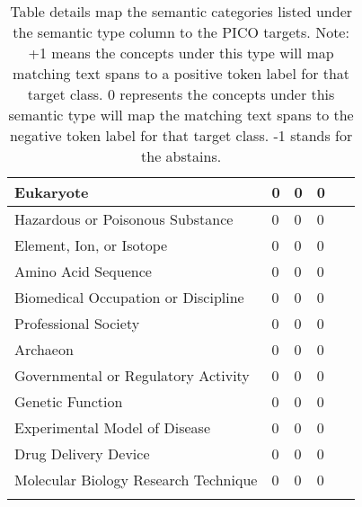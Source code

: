 \documentclass[10.7pt,]{article}
\begin{document}
\begin{longtable}{|l|p{0.3cm}|p{0.3cm}|p{0.3cm}|p{7.9cm}|}
        Eukaryote & 0 & 0 & 0 & ~ \\ \hline
        Hazardous or Poisonous Substance & 0 & 0 & 0 & ~ \\ \hline
        Element, Ion, or Isotope & 0 & 0 & 0 & ~ \\ \hline
        Amino Acid Sequence & 0 & 0 & 0 & ~ \\ \hline
        Biomedical Occupation or Discipline & 0 & 0 & 0 & ~ \\ \hline
        Professional Society & 0 & 0 & 0 & ~ \\ \hline
        Archaeon & 0 & 0 & 0 & ~ \\ \hline
        Governmental or Regulatory Activity & 0 & 0 & 0 & ~ \\ \hline
        Genetic Function & 0 & 0 & 0 & ~ \\ \hline
        Experimental Model of Disease & 0 & 0 & 0 & ~ \\ \hline
        Drug Delivery Device & 0 & 0 & 0 & ~ \\ \hline
        Molecular Biology Research Technique & 0 & 0 & 0 & ~ \\ \hline
    \caption{Table details map the semantic categories listed under the semantic type column to the PICO targets. Note: +1 means the concepts under this type will map matching text spans to a positive token label for that target class. 0 represents the concepts under this semantic type will map the matching text spans to the negative token label for that target class. -1 stands for the abstains.}
    \label{tab:source2target}
\end{longtable}
%
\end{document}

